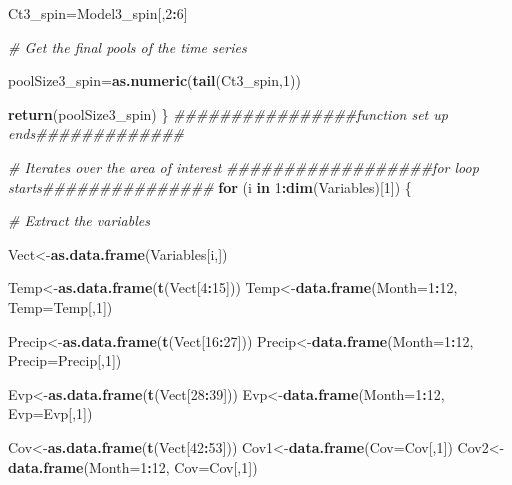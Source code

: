 \documentclass[
  10pt,
  b5paper,
]{book}
\newenvironment{Shaded}{\begin{snugshade}}{\end{snugshade}}
\newcommand{\CommentTok}[1]{\textcolor[rgb]{0.56,0.35,0.01}{\textit{#1}}}
\newcommand{\ControlFlowTok}[1]{\textcolor[rgb]{0.13,0.29,0.53}{\textbf{#1}}}
\newcommand{\DataTypeTok}[1]{\textcolor[rgb]{0.13,0.29,0.53}{#1}}
\newcommand{\DecValTok}[1]{\textcolor[rgb]{0.00,0.00,0.81}{#1}}
\newcommand{\KeywordTok}[1]{\textcolor[rgb]{0.13,0.29,0.53}{\textbf{#1}}}
\newcommand{\NormalTok}[1]{#1}
\newcommand{\OperatorTok}[1]{\textcolor[rgb]{0.81,0.36,0.00}{\textbf{#1}}}
\begin{document}
\begin{Shaded}
\begin{Highlighting}[]
\NormalTok{Ct3_spin=Model3_spin[,}\DecValTok{2}\OperatorTok{:}\DecValTok{6}\NormalTok{]}

\CommentTok{# Get the final pools of the time series}

\NormalTok{poolSize3_spin=}\KeywordTok{as.numeric}\NormalTok{(}\KeywordTok{tail}\NormalTok{(Ct3_spin,}\DecValTok{1}\NormalTok{))}

\KeywordTok{return}\NormalTok{(poolSize3_spin)}
\NormalTok{\}}
\CommentTok{################function set up ends#############}


\CommentTok{# Iterates over the area of interest}
\CommentTok{##################for loop starts###############}
\ControlFlowTok{for}\NormalTok{ (i }\ControlFlowTok{in} \DecValTok{1}\OperatorTok{:}\KeywordTok{dim}\NormalTok{(Variables)[}\DecValTok{1}\NormalTok{]) \{}

\CommentTok{# Extract the variables }

\NormalTok{Vect<-}\KeywordTok{as.data.frame}\NormalTok{(Variables[i,])}

\NormalTok{Temp<-}\KeywordTok{as.data.frame}\NormalTok{(}\KeywordTok{t}\NormalTok{(Vect[}\DecValTok{4}\OperatorTok{:}\DecValTok{15}\NormalTok{]))}
\NormalTok{Temp<-}\KeywordTok{data.frame}\NormalTok{(}\DataTypeTok{Month=}\DecValTok{1}\OperatorTok{:}\DecValTok{12}\NormalTok{, }\DataTypeTok{Temp=}\NormalTok{Temp[,}\DecValTok{1}\NormalTok{])}

\NormalTok{Precip<-}\KeywordTok{as.data.frame}\NormalTok{(}\KeywordTok{t}\NormalTok{(Vect[}\DecValTok{16}\OperatorTok{:}\DecValTok{27}\NormalTok{]))}
\NormalTok{Precip<-}\KeywordTok{data.frame}\NormalTok{(}\DataTypeTok{Month=}\DecValTok{1}\OperatorTok{:}\DecValTok{12}\NormalTok{, }\DataTypeTok{Precip=}\NormalTok{Precip[,}\DecValTok{1}\NormalTok{])}

\NormalTok{Evp<-}\KeywordTok{as.data.frame}\NormalTok{(}\KeywordTok{t}\NormalTok{(Vect[}\DecValTok{28}\OperatorTok{:}\DecValTok{39}\NormalTok{]))}
\NormalTok{Evp<-}\KeywordTok{data.frame}\NormalTok{(}\DataTypeTok{Month=}\DecValTok{1}\OperatorTok{:}\DecValTok{12}\NormalTok{, }\DataTypeTok{Evp=}\NormalTok{Evp[,}\DecValTok{1}\NormalTok{])}
	
\NormalTok{Cov<-}\KeywordTok{as.data.frame}\NormalTok{(}\KeywordTok{t}\NormalTok{(Vect[}\DecValTok{42}\OperatorTok{:}\DecValTok{53}\NormalTok{]))}
\NormalTok{Cov1<-}\KeywordTok{data.frame}\NormalTok{(}\DataTypeTok{Cov=}\NormalTok{Cov[,}\DecValTok{1}\NormalTok{])}
\NormalTok{Cov2<-}\KeywordTok{data.frame}\NormalTok{(}\DataTypeTok{Month=}\DecValTok{1}\OperatorTok{:}\DecValTok{12}\NormalTok{, }\DataTypeTok{Cov=}\NormalTok{Cov[,}\DecValTok{1}\NormalTok{])}


\end{Highlighting}
\end{Shaded}
\end{document}

